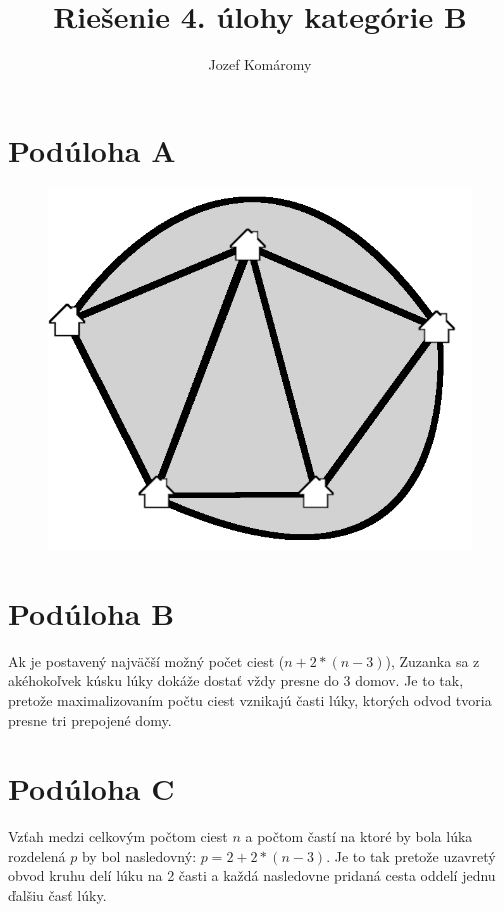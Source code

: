 \documentclass{article}
\begin{document}
\title{Riešenie 4. úlohy kategórie B}
\author{Jozef Komáromy}

\maketitle

\section{Podúloha A}

\begin{figure}[h]
  \centering
\includegraphics{A}
\end{figure}

\section{Podúloha B}

Ak je postavený najväčší možný počet ciest (\(n + 2 * (n - 3)\)), Zuzanka sa z akéhokoľvek kúsku lúky dokáže dostať vždy presne do 3 domov. Je to tak, pretože maximalizovaním počtu ciest vznikajú časti lúky, ktorých odvod tvoria presne tri prepojené domy.

\section{Podúloha C}

Vzťah medzi celkovým počtom ciest \(n\) a počtom častí na ktoré by bola lúka rozdelená \(p\) by bol nasledovný: \(p = 2 + 2 * (n - 3)\). Je to tak pretože uzavretý obvod kruhu delí lúku na 2 časti a každá nasledovne pridaná cesta oddelí jednu ďalšiu časť lúky.
\end{document}
